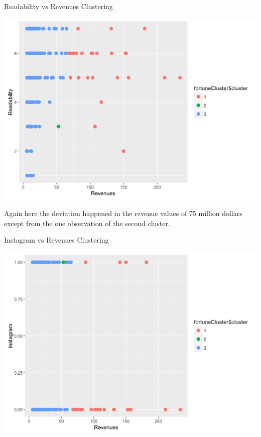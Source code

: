 \documentclass{article}
\begin{document}
\begin{table}[H]
\centering
\caption{Readability vs Revenues Clustering}
\begin{center}
\includegraphics[scale=0.5]{../R/photos/92_clust_read.png}   \\
\end{center}
\end{table}
Again here the deviation happened in the revenue values of 75 million dollars except from the one observation of the second cluster.
\begin{table}[H]
\centering
\caption{Instagram vs Revenues Clustering}
\begin{center}
\includegraphics[scale=0.5]{../R/photos/93_clust_inst.png}   \\
\end{center}
\end{table}
\end{document}
